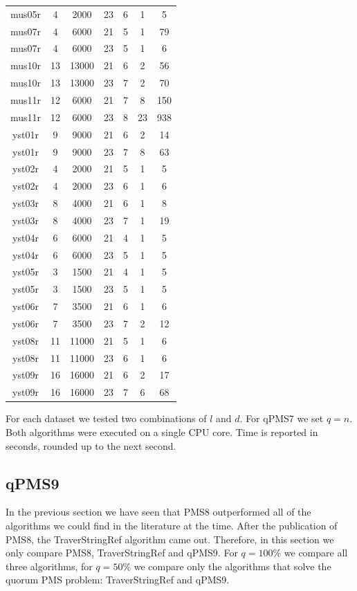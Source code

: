 \begin{table}
{\begin{tabular}{ccccccc@{\extracolsep\fill}}
mus05r & 4 & 2000 & 23 & 6 & 1 & 5 \\
mus07r & 4 & 6000 & 21 & 5 & 1 & 79 \\
mus07r & 4 & 6000 & 23 & 5 & 1 & 6 \\
mus10r & 13 & 13000 & 21 & 6 & 2 & 56 \\
mus10r & 13 & 13000 & 23 & 7 & 2 & 70 \\
mus11r & 12 & 6000 & 21 & 7 & 8 & 150 \\
mus11r & 12 & 6000 & 23 & 8 & 23 & 938 \\
\hline
yst01r & 9 & 9000 & 21 & 6 & 2 & 14 \\
yst01r & 9 & 9000 & 23 & 7 & 8 & 63 \\
yst02r & 4 & 2000 & 21 & 5 & 1 & 5 \\
yst02r & 4 & 2000 & 23 & 6 & 1 & 6 \\
yst03r & 8 & 4000 & 21 & 6 & 1 & 8 \\
yst03r & 8 & 4000 & 23 & 7 & 1 & 19 \\
yst04r & 6 & 6000 & 21 & 4 & 1 & 5 \\
yst04r & 6 & 6000 & 23 & 5 & 1 & 5 \\
yst05r & 3 & 1500 & 21 & 4 & 1 & 5 \\
yst05r & 3 & 1500 & 23 & 5 & 1 & 5 \\
yst06r & 7 & 3500 & 21 & 6 & 1 & 6 \\
yst06r & 7 & 3500 & 23 & 7 & 2 & 12 \\
yst08r & 11 & 11000 & 21 & 5 & 1 & 6 \\
yst08r & 11 & 11000 & 23 & 6 & 1 & 6 \\
yst09r & 16 & 16000 & 21 & 6 & 2 & 17 \\
yst09r & 16 & 16000 & 23 & 7 & 6 & 68 \\
\hline
\end{tabular}
}

For each dataset we tested two combinations of $l$ and $d$. For qPMS7 we set $q=n$. Both algorithms were executed on a single CPU core. Time is reported in seconds, rounded up to the next second.
\end{table}



\subsection{qPMS9}
In the previous section we have seen that PMS8 outperformed all of the
algorithms we could find in the literature at the time. After the
publication of PMS8, the TraverStringRef \cite{T14} algorithm came out.
Therefore, in this section we only compare PMS8, TraverStringRef and qPMS9. For
$q=100\%$ we compare all three algorithms, for $q=50\%$ we compare only the
algorithms that solve the quorum PMS problem: TraverStringRef and qPMS9.

